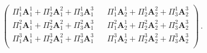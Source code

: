\begin{equation}
\begin{split}
\begin{pmatrix}
      \Pi^1_1 \mathbf{A}^1_1 + \Pi^1_2 \mathbf{A}^2_1 + \Pi^1_3 \mathbf{A}^3_1 &&
      \Pi^1_1 \mathbf{A}^1_2 + \Pi^1_2 \mathbf{A}^2_2 + \Pi^1_3 \mathbf{A}^3_2 \\
      \Pi^2_1 \mathbf{A}^1_1 + \Pi^2_2 \mathbf{A}^2_1 + \Pi^2_3 \mathbf{A}^3_1 &&
      \Pi^2_1 \mathbf{A}^1_2 + \Pi^2_2 \mathbf{A}^2_2 + \Pi^2_3 \mathbf{A}^3_2 \\
      \Pi^3_1 \mathbf{A}^1_1 + \Pi^3_2 \mathbf{A}^2_1 + \Pi^3_3 \mathbf{A}^3_1 &&
      \Pi^3_1 \mathbf{A}^1_2 + \Pi^3_2 \mathbf{A}^2_2 + \Pi^3_3 \mathbf{A}^3_2 \\
    \end{pmatrix}\,.
  \end{split}
\end{equation}



